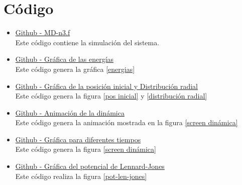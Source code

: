 \documentclass[reprint,amsmath,amssymb,aps,]{revtex4-2}
\begin{document}
\section{Código}
\begin{itemize}
\item \href{https://github.com/giovannilopez9808/Notas_Agosto_2020/blob/master/Simulaciones/Proyecto_1/Scripts/MD-n3.f}{Github - MD-n3.f}\\
Este código contiene la simulación del sistema.
\item \href{https://github.com/giovannilopez9808/Notas_Agosto_2020/blob/master/Simulaciones/Proyecto_1/Scripts/Energy_Graphics.py}{Github - Gráfica de las energías}\\
Este código genera la gráfica \ref{energias}
\item \href{https://github.com/giovannilopez9808/Notas_Agosto_2020/blob/master/Simulaciones/Proyecto_1/Scripts/Cor_Graphics.py}{Github - Gráfica de la posición inicial y Distribución radial}\\
Este código genera la figura \ref{pos inicial} y \ref{distribución radial}
\item \href{https://github.com/giovannilopez9808/Notas_Agosto_2020/blob/master/Simulaciones/Proyecto_1/Scripts/Dim_gif.py}{Github - Animación de la dinámica}\\
Este código genera la animación mostrada en la figura \ref{screen dinámica}
\item \href{https://github.com/giovannilopez9808/Notas_Agosto_2020/blob/master/Simulaciones/Proyecto_1/Scripts/Dim_Graphics.py}{Github - Gráfica para diferentes tiempos}\\
Este código genera la figura \ref{screen dinámica}
\item \href{https://github.com/giovannilopez9808/Notas_Agosto_2020/blob/master/Simulaciones/Proyecto_1/Scripts/Potencial_Graphics.py}{Github - Gráfica del potencial de Lennard-Jones}\\
Este código realiza la figura \ref{pot-len-jones}
\end{itemize}
\nocite{*}

\end{document}

